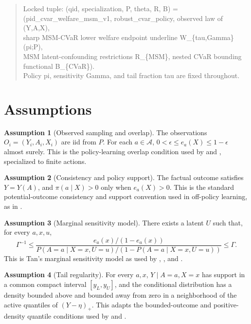 \documentclass[11pt]{article}
\theoremstyle{definition}
\newtheorem{assumption}{Assumption}
\theoremstyle{plain}
\theoremstyle{remark}
\begin{document}
\begin{quote}
\small\ttfamily
Locked tuple: (qid, specialization, P, theta, R, B) =\\
(pid\_cvar\_welfare\_msm\_v1, robust\_cvar\_policy, observed law of (Y,A,X),\\
sharp MSM-CVaR lower welfare endpoint underline W\_\{tau,Gamma\}(pi;P),\\
MSM latent-confounding restrictions R\_\{MSM\}, nested CVaR bounding functional B\_\{CVaR\}).\\
Policy pi, sensitivity Gamma, and tail fraction tau are fixed throughout.
\end{quote}

\section{Assumptions}
\begin{assumption}[Observed sampling and overlap]\label{ass:iid-overlap}
The observations \(O_i=(Y_i,A_i,X_i)\) are iid from \(P\).  For each \(a\in\mathcal A\), \(0<\epsilon\leq e_a(X)\leq 1-\epsilon\) almost surely.  This is the policy-learning overlap condition used by \citet{HessFrauenMelnychukFeuerriegel2025SharpOPE} and \citet{AtheyWager2021PolicyLearning}, specialized to finite actions.
\end{assumption}

\begin{assumption}[Consistency and policy support]\label{ass:consistency}
The factual outcome satisfies \(Y=Y(A)\), and \(\pi(a\mid X)>0\) only when \(e_a(X)>0\).  This is the standard potential-outcome consistency and support convention used in off-policy learning, as in \citet{KallusZhou2018ConfoundingRobustPolicy}.
\end{assumption}

\begin{assumption}[Marginal sensitivity model]\label{ass:msm}
There exists a latent \(U\) such that, for every \(a,x,u\),
\[
\Gamma^{-1}\leq
\frac{e_a(x)/(1-e_a(x))}
{P(A=a\mid X=x,U=u)/(1-P(A=a\mid X=x,U=u))}
\leq \Gamma .
\]
This is Tan's marginal sensitivity model as used by \citet{DornGuo2021QuantileBalancing}, \citet{DornGuoKallus2021DoublySharp}, and \citet{HessFrauenMelnychukFeuerriegel2025SharpOPE}.
\end{assumption}

\begin{assumption}[Tail regularity]\label{ass:tail}
For every \(a,x\), \(Y\mid A=a,X=x\) has support in a common compact interval \([y_L,y_U]\), and the conditional distribution has a density bounded above and bounded away from zero in a neighborhood of the active quantiles of \((Y-\eta)_+\).  This adapts the bounded-outcome and positive-density quantile conditions used by \citet{DornGuo2021QuantileBalancing} and \citet{HessFrauenMelnychukFeuerriegel2025SharpOPE}.
\end{assumption}
\end{document}
